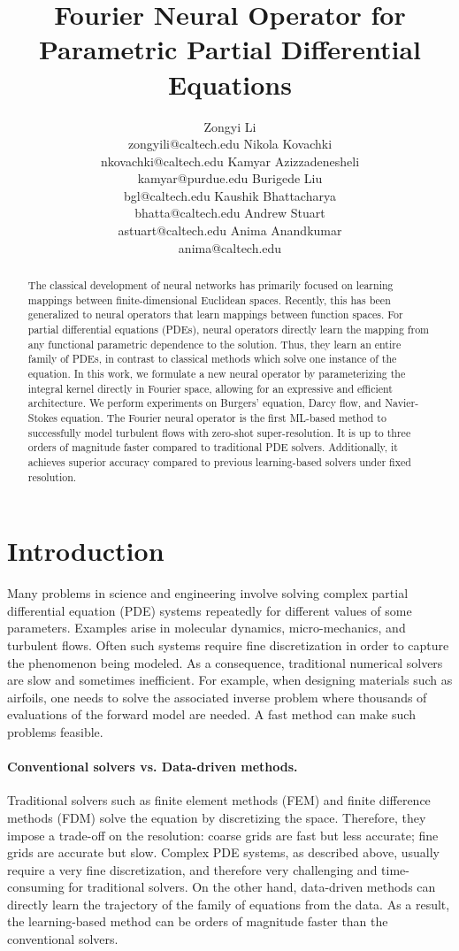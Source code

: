 \documentclass{article} %
\title{Fourier Neural Operator for \\
Parametric Partial Differential Equations}
\author{Zongyi Li \\zongyili@caltech.edu
\And Nikola Kovachki  \\nkovachki@caltech.edu
\And  Kamyar Azizzadenesheli \\kamyar@purdue.edu
\And Burigede Liu \\bgl@caltech.edu
\And Kaushik Bhattacharya \\bhatta@caltech.edu
\And  Andrew Stuart \\astuart@caltech.edu
\And Anima Anandkumar \\anima@caltech.edu
}
\begin{document}
  


\maketitle

\begin{abstract}
The classical development of neural networks has primarily focused on learning mappings between finite-dimensional Euclidean spaces.  Recently, this has been generalized to neural operators that learn mappings between function spaces. For partial differential equations (PDEs), neural operators directly learn the mapping from any functional parametric dependence to the solution. Thus, they learn an entire family of PDEs, in contrast to classical methods which solve one instance of the equation. 
In this work, we formulate a new neural operator by parameterizing the integral kernel directly in Fourier space, allowing for an expressive and efficient architecture. 
We perform experiments on Burgers' equation, Darcy flow, and Navier-Stokes equation. The Fourier neural operator is the first ML-based method to successfully model turbulent flows with zero-shot super-resolution. It is up to three orders of magnitude faster compared to traditional PDE solvers. Additionally, it achieves superior accuracy compared to previous learning-based solvers under fixed resolution. 
\end{abstract}

\section{Introduction}
\label{sec:intro}
Many problems in science and engineering involve solving complex partial differential equation (PDE) systems repeatedly for different values of some parameters. Examples arise in molecular dynamics, micro-mechanics, and turbulent flows. Often such systems require fine discretization in order to capture the phenomenon being modeled. 
As a consequence, traditional numerical solvers are slow and sometimes inefficient. For example, when designing materials such as airfoils, one needs to solve the associated inverse problem where thousands of evaluations of the forward model are needed. A fast method can make such problems feasible. 

\paragraph{Conventional solvers vs. Data-driven methods.} 
Traditional solvers such as finite element methods (FEM) and finite difference methods (FDM) solve the equation by discretizing the space. Therefore, they impose a trade-off on the resolution: coarse grids are fast but less accurate; fine grids are accurate but slow. Complex PDE systems, as described above, usually require a very fine discretization, and therefore very challenging and time-consuming for traditional solvers. 
On the other hand, data-driven methods can directly learn the trajectory of the family of equations from the data. As a result, the learning-based method can be orders of magnitude faster than the conventional solvers. 
\end{document}
